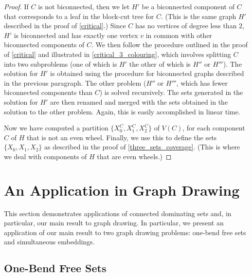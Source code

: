 \documentclass[11pt]{article}
\theoremstyle{definition}
\begin{document}
\begin{proof}
If $C$ is not biconnected, then we let $H'$ be a biconnected component of $C$ that corresponds to a leaf in the block-cut tree for $C$.  (This is the same graph $H'$ described in the proof of \cref{critical}.)  Since $C$ has no vertices of degree less than $2$, $H'$ is biconnected and has exactly one vertex $v$ in common with other biconnected components of $C$.  We then follow the procedure outlined in the proof of \cref{critical} and illustrated in \cref{critical_3_colouring}, which involves splitting $C$ into two subproblems (one of which is $H'$ the other of which is $H''$ or $H'''$).  The solution for $H'$ is obtained using the procedure for biconnected graphs described in the previous paragraph.  The other problem ($H''$ or $H'''$, which has fewer biconnected components than $C$) is solved recursively.  The sets generated in the solution for $H'$ are then renamed and merged with the sets obtained in the solution to the other problem.  Again, this is easily accomplished in linear time.

Now we have computed a partition $\{X^C_0,X^C_1,X^C_2\}$ of $V(C)$, for each component $C$ of $H$ that is not an even wheel.  Finally, we use this to define the sets $\{X_0,X_1,X_2\}$ as described in the proof of \cref{three_sets_coverage}.  (This is where we deal with components of $H$ that are even wheels.)
\end{proof}


%



\section{An Application in Graph Drawing}
\label{gd}

This section demonstrates applications of connected dominating sets and, in particular, our main result to graph drawing. In particular, we present an application of our main result to two graph drawing problems: one-bend free sets and simultaneous embeddings. 

\subsection{One-Bend Free Sets}

\end{document}
